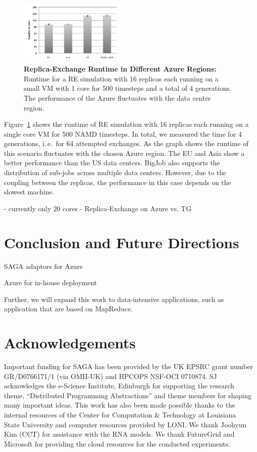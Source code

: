 \documentclass[conference,final]{IEEEtran}
\newcommand{\up}{\vspace*{-1em}}
\def\acknowledgementname{Acknowledgements}
\newenvironment{acknowledgement}%
{\section*{\acknowledgementname}%
\parindent=0pt%
}
\newcommand{\alnote}[1]{ {\textcolor{blue} { ***AL: #1 }}}
\newcommand{\alnote}[1]{}
\begin{document}
\begin{figure}[htbp]
    \centering
        \includegraphics[width=0.46\textwidth]{performance/repex_runtime_per_region.pdf}
    \caption{\textbf{Replica-Exchange Runtime in Different Azure Regions:} Runtime for a RE simulation with 
    16 replicas each running on a small VM with 1 core for 500 timesteps and a total of 4 generations. The performance of
    the Azure fluctuates with the data center region. }
    \label{fig:performance_repex_runtime_per_region}
\end{figure}

Figure~\ref{fig:performance_repex_runtime_per_region} shows the runtime of RE simulation
with 16 replicas each running on a single core VM for 500 NAMD timesteps. In total, we measured
the time for 4 generations, i.\,e.\ for 64 attempted exchanges. As the graph shows the runtime
of this scenario fluctuates with the chosen Azure region. The EU and Asia show a better performance
than the US data centers. BigJob also supports the distribution of sub-jobs across multiple data 
centers. However, due to the coupling between the replicas, the performance in this case
depends on the slowest machine.


- currently only 20 cores 
- Replica-Exchange on Azure vs. TG


\alnote{qualitative comparison: easy coordination with queue service}
\alnote{distribution how easy in comparison to TG?}
\alnote{startup time based on different data center?}
\section{Conclusion and Future Directions}


SAGA adaptors for Azure

Azure for in-house deployment

Further, we will expand this work to data-intensive applications, such as 
application that are based on MapReduce.


\begin{acknowledgement} 
  \up \footnotesize{Important funding for SAGA has been provided by
    the UK EPSRC grant number GR/D0766171/1 (via OMII-UK) and HPCOPS
    NSF-OCI 0710874. SJ acknowledges the e-Science Institute,
    Edinburgh for supporting the research theme, ``Distributed
    Programming Abstractions'' and theme members for shaping many
    important ideas. This work has also been made possible thanks to
    the internal resources of the Center for Computation \& Technology
    at Louisiana State University and computer resources provided by
    LONI. We thank Joohyun Kim (CCT) for
    assistance with the RNA models. We thank FutureGrid and Microsoft
    for providing the cloud resources for the conducted experiments. }
\end{acknowledgement}

\up


\end{document}
